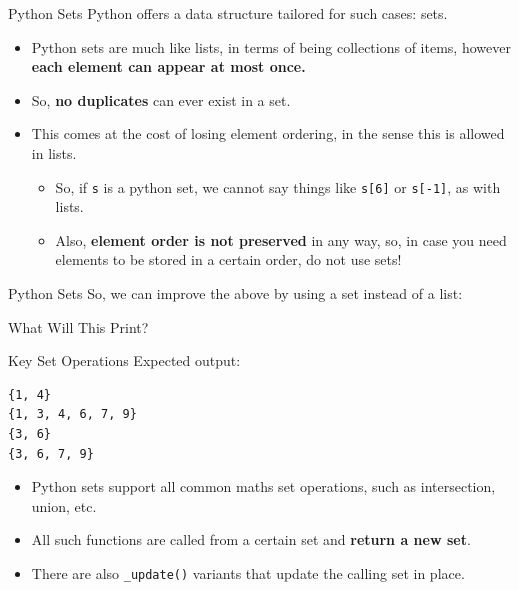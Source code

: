 \documentclass[aspectratio=169, 12pt, xcolor=table]{beamer}
\begin{document}
	\begin{frame}{Python Sets}
		Python offers a data structure tailored for such cases: sets.
		\begin{itemize}
			\item Python sets are much like lists, in terms of being collections of items, however \textbf{each element can appear at most once.}
			\item So, \textbf{no duplicates} can ever exist in a set.
			\item This comes at the cost of losing element ordering, in the sense this is allowed in lists.
			\begin{itemize}
				\item So, if \texttt{s} is a python set, we cannot say things like \texttt{s[6]} or \texttt{s[-1]}, as with lists.
				\item Also, \textbf{element order is not preserved} in any way, so, in case you need elements to be stored in a certain order, do not use sets!
			\end{itemize}
		\end{itemize}
	\end{frame}
	
	\begin{frame}{Python Sets}
		So, we can improve the above by using a set instead of a list:
		
	\end{frame}

	\begin{frame}{What Will This Print?}
		
	\end{frame}

	\begin{frame}[fragile]{Key Set Operations}
		Expected output:
		\begin{lstlisting}
{1, 4}
{1, 3, 4, 6, 7, 9}
{3, 6}
{3, 6, 7, 9}
\end{lstlisting}
		\begin{itemize}
			\item Python sets support all common maths set operations, such as intersection, union, etc.
			\item All such functions are called from a certain set and \textbf{return a new set}.
			\item There are also \texttt{\_update()} variants that update the calling set in place.
		\end{itemize}
	\end{frame}
\end{document}
